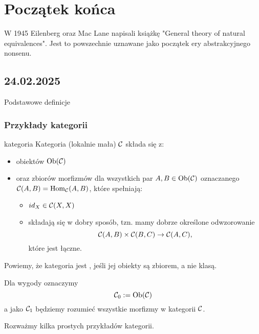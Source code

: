 \chapter{Początek końca}

W 1945 Eilenberg oraz Mac Lane napisali książkę "General theory of natural equivalences". Jest to powszechnie uznawane jako początek ery abstrakcyjnego nonsenu.

\section{24.02.2025}{Podstawowe definicje}

\subsection{Przykłady kategorii}

\begin{definition}{kategoria}{}
  Kategoria (lokalnie mała) $\mathcal{C}$ składa się z:
  \begin{itemize}
    \item obiektów $\operatorname{Ob}(\mathcal{C})$
    \item oraz zbiorów morfizmów dla wszystkich par $A,B\in\operatorname{Ob}(\mathcal{C})$ oznaczanego $\mathcal{C}(A, B)=\operatorname{Hom}_{\mathcal{C}}(A, B)$, które spełniają:
      \begin{itemize}
        \item $id_X\in\mathcal{C}(X, X)$
        \item składają się w dobry sposób, tzn. mamy dobrze określone odwzorowanie
          $$\mathcal{C}(A, B)\times\mathcal{C}(B, C)\to \mathcal{C}(A, C),$$
          które jest łączne.
      \end{itemize}
  \end{itemize}
\end{definition}

Powiemy, że kategoria jest , jeśli jej obiekty są zbiorem, a nie klasą. 

Dla wygody oznaczymy
$$\mathcal{C}_0:=\operatorname{Ob}(\mathcal{C})$$
a jako $\mathcal{C}_1$ będziemy rozumieć wszystkie morfizmy w kategorii $\mathcal{C}$.

Rozważmy kilka prostych przykładów kategorii.

